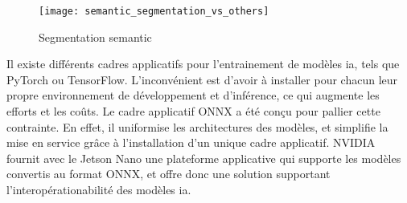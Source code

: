 \begin{figure}[H]
    \centering
    \texttt{[image: semantic\_segmentation\_vs\_others]}
    \caption[Segmentation semantic]{Segmentation semantic\parencite[p.~1]{wu_recent_2019}}
    \label{fig:semantic_segmentation_vs_others}
 \end{figure}
\noindent Il existe différents cadres applicatifs pour l'entrainement de modèles \acrshort{ia}, tels que PyTorch ou TensorFlow. L'inconvénient est d'avoir à installer pour chacun leur propre environnement de développement et d'inférence, ce qui augmente les efforts et les coûts. Le cadre applicatif ONNX a été conçu pour pallier cette contrainte. En effet, il uniformise les architectures des modèles, et simplifie la mise en service grâce à l'installation d'un unique cadre applicatif. NVIDIA fournit avec le Jetson Nano une plateforme applicative qui supporte les modèles convertis au format ONNX, et offre donc une solution supportant l'interopérationabilité des modèles \acrshort{ia}. 